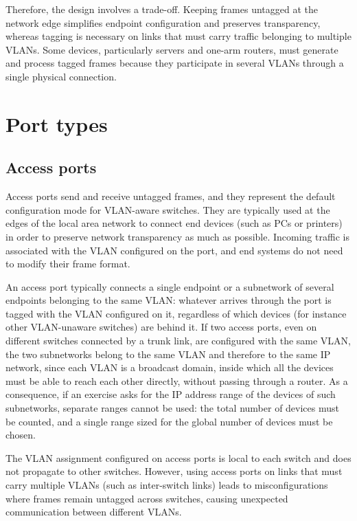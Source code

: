 \documentclass[11pt,a4paper,openany]{report}
\begin{document}
Therefore, the design involves a trade-off. Keeping frames untagged at the network edge simplifies endpoint configuration and preserves transparency, whereas tagging is necessary on links that must carry traffic belonging to multiple VLANs. Some devices, particularly servers and one-arm routers, must generate and process tagged frames because they participate in several VLANs through a single physical connection.
\section{Port types}

\subsection{Access ports}

Access ports send and receive untagged frames, and they represent the default configuration mode for VLAN-aware switches. They are typically used at the edges of the local area network to connect end devices (such as PCs or printers) in order to preserve network transparency as much as possible. Incoming traffic is associated with the VLAN configured on the port, and end systems do not need to modify their frame format.

An access port typically connects a single endpoint or a subnetwork of several endpoints belonging to the same VLAN: whatever arrives through the port is tagged with the VLAN configured on it, regardless of which devices (for instance other VLAN-unaware switches) are behind it. If two access ports, even on different switches connected by a trunk link, are configured with the same VLAN, the two subnetworks belong to the same VLAN and therefore to the same IP network, since each VLAN is a broadcast domain, inside which all the devices must be able to reach each other directly, without passing through a router. As a consequence, if an exercise asks for the IP address range of the devices of such subnetworks, separate ranges cannot be used: the total number of devices must be counted, and a single range sized for the global number of devices must be chosen.


The VLAN assignment configured on access ports is local to each switch and does not propagate to other switches. However, using access ports on links that must carry multiple VLANs (such as inter-switch links) leads to misconfigurations where frames remain untagged across switches, causing unexpected communication between different VLANs.
\end{document}
